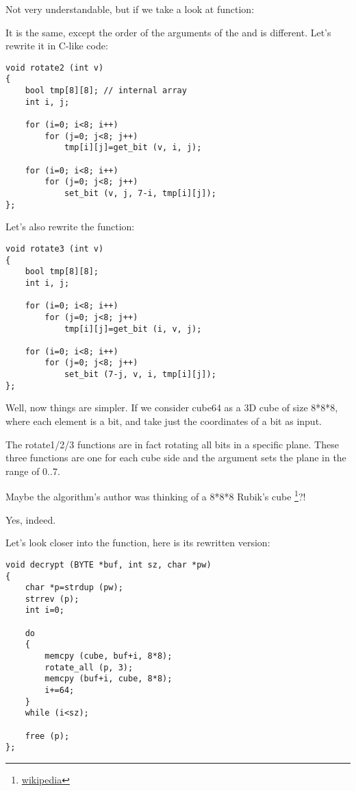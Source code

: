 Not very understandable, but if we take a look at  function:



It is  the same, except the order of the arguments of the  and  is different. 
Let's rewrite it in C-like code:

\begin{lstlisting}[style=customc]
void rotate2 (int v)
{
	bool tmp[8][8]; // internal array
	int i, j;

	for (i=0; i<8; i++)
		for (j=0; j<8; j++)
			tmp[i][j]=get_bit (v, i, j);

	for (i=0; i<8; i++)
		for (j=0; j<8; j++)
			set_bit (v, j, 7-i, tmp[i][j]);
};
\end{lstlisting}

Let's also rewrite the  function:

\begin{lstlisting}[style=customc]
void rotate3 (int v)
{
	bool tmp[8][8];
	int i, j;

	for (i=0; i<8; i++)
		for (j=0; j<8; j++)
			tmp[i][j]=get_bit (i, v, j);

	for (i=0; i<8; i++)
		for (j=0; j<8; j++)
			set_bit (7-j, v, i, tmp[i][j]);
};
\end{lstlisting}

Well, now things are simpler. If we consider cube64 as a 3D cube of size 8*8*8, where each element is a bit, 
 and  take just the coordinates of a bit as input.

The rotate1/2/3 functions are in fact rotating all bits in a specific plane. 
These three functions are one for each cube side and the  argument sets the plane in the range of 0..7.

Maybe the algorithm's author was thinking of a 8*8*8 Rubik's cube
\footnote{\href{http://go.yurichev.com/17115}{wikipedia}}?!

Yes, indeed.

Let's look closer into the  function, here is its rewritten version:

\begin{lstlisting}[style=customc]
void decrypt (BYTE *buf, int sz, char *pw)
{
	char *p=strdup (pw);
	strrev (p);
	int i=0;

	do
	{
		memcpy (cube, buf+i, 8*8);
		rotate_all (p, 3);
		memcpy (buf+i, cube, 8*8);
		i+=64;
	}
	while (i<sz);
	
	free (p);
};
\end{lstlisting}

